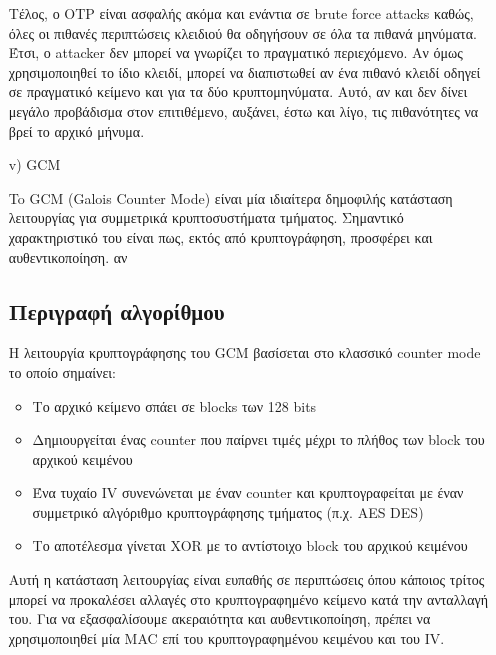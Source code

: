 \documentclass[a4paper, 11pt]{article}
\newcommand{\lt}{\latintext}
\begin{document}
\begin{itemize}
	Τέλος, ο {\lt OTP} είναι ασφαλής ακόμα και ενάντια σε {\lt brute force attacks} καθώς, όλες οι πιθανές περιπτώσεις κλειδιού θα οδηγήσουν σε όλα τα πιθανά μηνύματα. Έτσι, ο {\lt attacker} δεν μπορεί να γνωρίζει το πραγματικό περιεχόμενο. Αν όμως χρησιμοποιηθεί το ίδιο κλειδί, μπορεί να διαπιστωθεί αν ένα πιθανό κλειδί οδηγεί σε πραγματικό κείμενο και για τα δύο κρυπτομηνύματα. Αυτό, αν και δεν δίνει μεγάλο προβάδισμα στον επιτιθέμενο, αυξάνει, έστω και λίγο, τις πιθανότητες να βρεί το αρχικό μήνυμα.

	\item[{\lt v)}] {\lt GCM}

	To {\lt GCM (Galois Counter Mode)} είναι μία ιδιαίτερα δημοφιλής κατάσταση λειτουργίας για συμμετρικά κρυπτοσυστήματα τμήματος. Σημαντικό χαρακτηριστικό του είναι πως, εκτός από κρυπτογράφηση, προσφέρει και αυθεντικοποίηση. αν

	\subsection*{Περιγραφή αλγορίθμου}
	Η λειτουργία κρυπτογράφησης του {\lt GCM} βασίσεται στο κλασσικό {\lt counter mode} το οποίο σημαίνει:
	\begin{itemize}
		\item Το αρχικό κείμενο σπάει σε {\lt blocks} των 128 {\lt bits}
		\item Δημιουργείται ένας {\lt counter} που παίρνει τιμές μέχρι το πλήθος των {\lt block} του αρχικού κειμένου
		\item Ένα τυχαίο {\lt IV} συνενώνεται με έναν {\lt counter} και κρυπτογραφείται με έναν συμμετρικό αλγόριθμο κρυπτογράφησης τμήματος (π.χ. {\lt AES DES})
		\item Tο αποτέλεσμα γίνεται {\lt XOR} με το αντίστοιχο {\lt block} του αρχικού κειμένου
	\end{itemize}

	Αυτή η κατάσταση λειτουργίας είναι ευπαθής σε περιπτώσεις όπου κάποιος τρίτος μπορεί να προκαλέσει αλλαγές στο κρυπτογραφημένο κείμενο κατά την ανταλλαγή του. Για να εξασφαλίσουμε ακεραιότητα και αυθεντικοποίηση, πρέπει να χρησιμοποιηθεί μία {\lt MAC} επί του κρυπτογραφημένου κειμένου και του {\lt IV}.


\end{itemize}
\end{document}
